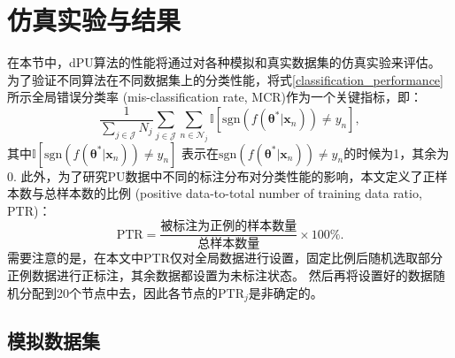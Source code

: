 \section{仿真实验与结果}\label{Experiments}
在本节中，dPU算法的性能将通过对各种模拟和真实数据集的仿真实验来评估。  
为了验证不同算法在不同数据集上的分类性能，将式\eqref{classification_performance}所示全局错误分类率
(mis-classification rate, MCR)作为一个关键指标，即：
\begin{equation}
    \label{classification_performance}
    \frac{1}{\sum_{j\in\mathcal{J}}N_j}\sum_{j\in\mathcal{J}}\sum_{n\in\mathcal{N}_j}
    \mathbb{I}\left[\mathrm{sgn}\left(f\left(\boldsymbol\theta^*|\boldsymbol x_n\right)\right)\neq y_n\right],
\end{equation}
其中$\mathbb{I}\left[\mathrm{sgn}\left(f\left(\boldsymbol\theta^*|\boldsymbol x_n\right)\right)\neq y_n\right]$
表示在$\mathrm{sgn}\left(f\left(\boldsymbol\theta^*|\boldsymbol x_n\right)\right)\neq y_n$的时候为1，其余为0.
此外，为了研究PU数据中不同的标注分布对分类性能的影响，本文定义了正样本数与总样本数的比例
(positive data-to-total number of training data ratio, PTR)：
\begin{equation}
    \label{PTR}
    \text{PTR}=\frac{\text{被标注为正例的样本数量}}{\text{总样本数量}}\times 100\%.
\end{equation}  
需要注意的是，在本文中PTR仅对全局数据进行设置，固定比例后随机选取部分正例数据进行正标注，其余数据都设置为未标注状态。
然后再将设置好的数据随机分配到20个节点中去，因此各节点的$\text{PTR}_j$是非确定的。

\subsection{模拟数据集}


